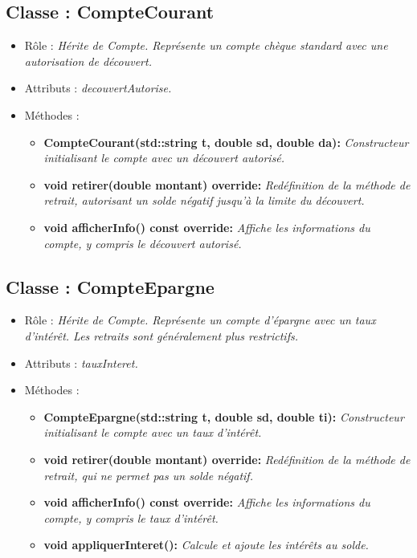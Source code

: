 \subsection{Classe : CompteCourant}
\begin{itemize}[leftmargin=*]
\item Rôle : \textit{Hérite de Compte. Représente un compte chèque standard avec une autorisation de découvert.}
\item Attributs : \textit{decouvertAutorise.}
\item Méthodes : 
     \begin{itemize}[leftmargin=*]
      \item \textbf{CompteCourant(std::string t, double sd, double da):} \textit{Constructeur initialisant le compte avec un découvert autorisé.}
      \item \textbf{void retirer(double montant) override:} \textit{Redéfinition de la méthode de retrait, autorisant un solde négatif jusqu'à la limite du découvert.}
      \item \textbf{void afficherInfo() const override:} \textit{Affiche les informations du compte, y compris le découvert autorisé.}
      \end{itemize} 
\end{itemize} 

\subsection{Classe : CompteEpargne}
\begin{itemize}[leftmargin=*]
\item Rôle : \textit{Hérite de Compte. Représente un compte d'épargne avec un taux d'intérêt. Les retraits sont généralement plus restrictifs.}
\item Attributs : \textit{tauxInteret.}
\item Méthodes : 
     \begin{itemize}[leftmargin=*]
      \item \textbf{CompteEpargne(std::string t, double sd, double ti):} \textit{Constructeur initialisant le compte avec un taux d'intérêt.}
      \item \textbf{void retirer(double montant) override:} \textit{Redéfinition de la méthode de retrait, qui ne permet pas un solde négatif.}
      \item \textbf{void afficherInfo() const override:} \textit{Affiche les informations du compte, y compris le taux d'intérêt.}
      \item \textbf{void appliquerInteret():} \textit{Calcule et ajoute les intérêts au solde.} 
      \end{itemize}
\end{itemize} 

